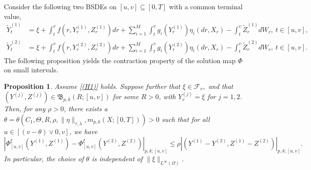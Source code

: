 \documentclass[11pt,reqno]{amsart}
\newtheorem{proposition}{Proposition}[section]
\numberwithin{equation}{section}
\begin{document}
Consider the following two BSDEs on $[u,v]\subseteq[0,T]$ with a common terminal value,
\begin{equation*}
\begin{aligned}
\tilde{Y}^{(1)}_{t} &= \xi + \int_{t}^{v}f(r,Y^{(1)}_{r},Z^{(1)}_{r})dr + \sum_{i=1}^{M}\int_{t}^{v}g_{i}(Y^{(1)}_{r})\eta_{i}(dr,X_{r}) -  \int_{t}^{v}\tilde{Z}^{(1)}_{r} dW_{r},\ t\in[u,v],\\
\tilde{Y}^{(2)}_{t} &= \xi + \int_{t}^{v}f(r,Y^{(2)}_{r},Z^{(2)}_{r})dr + \sum_{i=1}^{M}\int_{t}^{v}g_{i}(Y^{(2)}_{r})\eta_{i}(dr,X_{r}) - \int_{t}^{v} \tilde{Z}^{(2)}_{r} dW_{r},\ t\in[u,v].
\end{aligned}
\end{equation*}
The following proposition yields the  contraction property  of the solution map $\Phi$ on small intervals.
\begin{proposition}\label{prop:contraction map}
Assume \ref{(H1)} holds. Suppose further that $\xi \in\mathcal{F}_{v},$ and that $\left(Y^{(j)},Z^{(j)}\right)\in \mathfrak{B}_{p,k}(R;[u,v])$ for some $R>0$, with $Y^{(j)}_{v} = \xi$ for $j=1,2$.  Then, for any $\rho>0$, there exists a $\theta=\theta(C_1, \Theta, R, \rho, \|\eta\|_{\tau,\lambda},m_{p,k}(X;[0,T]))>0$ such that for all $u\in[(v-\theta)\vee 0,v]$, we have 
\begin{equation}\label{e:map-rho}
\left|\Phi^{\xi}_{[u,v]}\left(Y^{(1)}, Z^{(1)}\right) - \Phi^{\xi}_{[u,v]}\left( Y^{(2)}, Z^{(2)}\right)\right|_{p,k;[u,v]}\le \rho \left|\left(Y^{(1)} - Y^{(2)},Z^{(1)} - Z^{(2)}\right)\right|_{p,k;[u,v]}.
\end{equation}
In particular, the choice of $\theta$  is independent of $\|\xi\|_{L^{\infty}(\Omega)}$.
\end{proposition}
\end{document}

